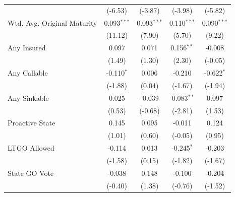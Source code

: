 \begin{tabular*}{\textwidth}{@{\extracolsep{\fill}}lcccc}
                               & (-6.53)               & (-3.87)                      & (-3.98)                      & (-5.82)\\   
   Wtd. Avg. Original Maturity & 0.093$^{***}$          & 0.093$^{***}$                 & 0.110$^{***}$                 & 0.090$^{***}$\\   
                               & (11.12)               & (7.90)                       & (5.70)                       & (9.22)\\   
   Any Insured                 & 0.097                  & 0.071                         & 0.156$^{**}$                  & -0.008\\   
                               & (1.49)                & (1.30)                       & (2.30)                       & (-0.05)\\   
   Any Callable                & -0.110$^{*}$           & 0.006                         & -0.210                        & -0.622$^{*}$\\   
                               & (-1.88)               & (0.04)                       & (-1.67)                      & (-1.94)\\   
   Any Sinkable                & 0.025                  & -0.039                        & -0.083$^{**}$                 & 0.097\\   
                               & (0.53)                & (-0.68)                      & (-2.81)                      & (1.53)\\   
   Proactive State             & 0.145                  & 0.095                         & -0.011                        & 0.124\\   
                               & (1.01)                & (0.60)                       & (-0.05)                      & (0.95)\\   
   LTGO Allowed                & -0.114                 & 0.013                         & -0.245$^{*}$                  & -0.203\\   
                               & (-1.58)               & (0.15)                       & (-1.82)                      & (-1.67)\\   
   State GO Vote               & -0.038                 & 0.148                         & -0.100                        & -0.204\\   
                               & (-0.40)               & (1.38)                       & (-0.76)                      & (-1.52)\\   

\end{tabular*}
